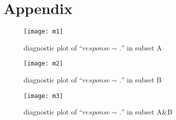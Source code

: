 \documentclass[conference,letterpaper]{IEEEtran}
\begin{document}
%
\newpage

\section*{\large Appendix}



\newpage
\begin{figure}[!t]
\centering
\texttt{[image: m1]}
\caption{diagnostic plot of ``$response \sim . $'' in subset A}
\label{fig_sim}
\end{figure}

\begin{figure}[!t]
\centering
\texttt{[image: m2]}
\caption{diagnostic plot of ``$response \sim . $'' in subset B}
\label{fig_sim}
\end{figure}
\begin{figure}[!t]
\centering
\texttt{[image: m3]}
\caption{diagnostic plot of ``$response \sim . $'' in subset A\&B}
\label{fig_sim}
\end{figure}

\ifCLASSOPTIONcaptionsoff
  \newpage
\fi
\end{document}
